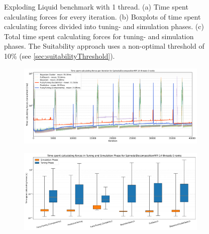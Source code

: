 \begin{figure}[H]
    \caption[Benchmark Results for the Exploding Liquid Scenario]{Exploding Liquid benchmark with 1 thread. (a) Time spent calculating forces for every iteration. (b) Boxplots of time spent calculating forces divided into tuning- and simulation phases. (c) Total time spent calculating forces for tuning- and simulation phases. The Suitability approach uses a non-optimal threshold of 10\% (see \autoref{sec:suitabilityThreshold}).}
    \label{fig:explodingLiquid_1thread}
\end{figure}

\begin{figure}[H]
    \centering

    \begin{subfigure}[c]{\textwidth}
        \includegraphics[width=\columnwidth,trim={0cm 0.4cm 0cm 0.9cm},clip]{figures/Benchmark/SpinodalDecompositionMPI/SpinodalDecompositionMPI_timings_SpinodalDecompositionMPI_14_0.png}
        \caption{}
        \label{fig:spinodalTimings_14thread}
    \end{subfigure}


    \begin{subfigure}[c]{\textwidth}
        \includegraphics[width=\columnwidth,trim={0cm 0.5cm 0cm 1cm},clip]{figures/Benchmark/SpinodalDecompositionMPI/SpinodalDecompositionMPI_timings_boxplot_SpinodalDecompositionMPI_14_0.png}
        \caption{}
        \label{fig:spinodalBoxplot_14thread}
    \end{subfigure}


\end{figure}
